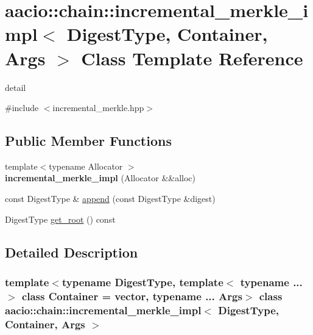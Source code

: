 \hypertarget{classaacio_1_1chain_1_1incremental__merkle__impl}{}\section{aacio\+:\+:chain\+:\+:incremental\+\_\+merkle\+\_\+impl$<$ Digest\+Type, Container, Args $>$ Class Template Reference}
\label{classaacio_1_1chain_1_1incremental__merkle__impl}


detail  




{\ttfamily \#include $<$incremental\+\_\+merkle.\+hpp$>$}

\subsection*{Public Member Functions}
\begin{DoxyCompactItemize}
\item 
\mbox{\label{classaacio_1_1chain_1_1incremental__merkle__impl_aa0e20cb7dde6f30576b14151d3f19ed6}} 
{\footnotesize template$<$typename Allocator $>$ }\\{\bfseries incremental\+\_\+merkle\+\_\+impl} (Allocator \&\&alloc)
\item 
const Digest\+Type \& \mbox{\hyperlink{classaacio_1_1chain_1_1incremental__merkle__impl_a2fd532370b7685284fc118736e228b75}{append}} (const Digest\+Type \&digest)
\item 
Digest\+Type \mbox{\hyperlink{classaacio_1_1chain_1_1incremental__merkle__impl_af3229013b3881f00e079636355ff2491}{get\+\_\+root}} () const
\end{DoxyCompactItemize}


\subsection{Detailed Description}
\subsubsection*{template$<$typename Digest\+Type, template$<$ typename ... $>$ class Container = vector, typename ... Args$>$\newline
class aacio\+::chain\+::incremental\+\_\+merkle\+\_\+impl$<$ Digest\+Type, Container, Args $>$}

